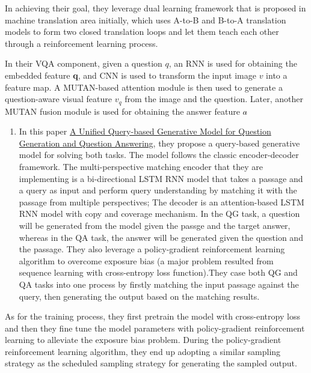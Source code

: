 \documentclass[]{book}
\providecommand{\tightlist}{%
  \setlength{\itemsep}{0pt}\setlength{\parskip}{0pt}}
\theoremstyle{definition}
\theoremstyle{definition}
\theoremstyle{definition}
\theoremstyle{remark}
\begin{document}
In achieving their goal, they leverage dual learning framework that is
proposed in machine translation area initially, which uses A-to-B and
B-to-A translation models to form two closed translation loops and let
them teach each other through a reinforcement learning process.

In their VQA component, given a question \(q\), an RNN is used for
obtaining the embedded feature \textbf{q}, and CNN is used to transform
the input image \(v\) into a feature map. A MUTAN-based attention module
is then used to generate a question-aware visual feature \(v_q\) from
the image and the question. Later, another MUTAN fusion module is used
for obtaining the answer feature \(a\hat{}\)

\begin{enumerate}
\def\labelenumi{\arabic{enumi}.}
\setcounter{enumi}{3}
\tightlist
\item
  In this paper \href{https://arxiv.org/pdf/1709.01058.pdf}{A Unified
  Query-based Generative Model for Question Generation and Question
  Answering}, they propose a query-based generative model for solving
  both tasks. The model follows the classic encoder-decoder framework.
  The multi-perspective matching encoder that they are implementing is a
  bi-directional LSTM RNN model that takes a passage and a query as
  input and perform query understanding by matching it with the passage
  from multiple perspectives; The decoder is an attention-based LSTM RNN
  model with copy and coverage mechanism. In the QG task, a question
  will be generated from the model given the passge and the target
  answer, whereas in the QA task, the answer will be generated given the
  question and the passage. They also leverage a policy-gradient
  reinforcement learning algorithm to overcome exposure bias (a major
  problem resulted from sequence learning with cross-entropy loss
  function).They case both QG and QA tasks into one process by firstly
  matching the input passage against the query, then generating the
  output based on the matching results.
\end{enumerate}

As for the training process, they first pretrain the model with
cross-entropy loss and then they fine tune the model parameters with
policy-gradient reinforcement learning to alleviate the exposure bias
problem. During the policy-gradient reinforcement learning algorithm,
they end up adopting a similar sampling strategy as the scheduled
sampling strategy for generating the sampled output.
\end{document}
